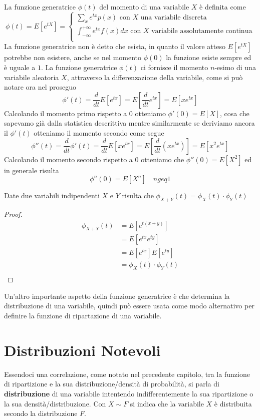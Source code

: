 \documentclass[a4paper,12pt, oneside]{book}
\begin{document}
La funzione generatrice $\phi(t)$ del momento di una variabile $X$ è definita come
\[ \phi(t) = E[e ^{tX}] = \begin{cases}
                              \sum _x e^{tx} p(x) \mbox{ con $X$ una variabile discreta}\\
                              \int _{-\infty}^{+\infty} e^{tx} f(x) dx \mbox{ con $X$ variabile assolutamente continua}\\
                          \end{cases} \]
La funzione generatrice non è detto che esista, in quanto il valore atteso $E[e^{tX}]$ potrebbe non esistere, anche se 
nel momento $\phi(0)$ la funzione esiste sempre ed è uguale a $1$.\newline
La funzione generatrice $\phi(t)$ ci fornisce il momento $n$-esimo di una variabile aleatoria $X$, attraverso la
differenzazione della variabile, come si può notare ora nel proseguo
\[ \phi'(t) = \frac{d}{dt} E[e^{tx}] = E[\frac{d}{dt} e^{tx}] = E[xe^{tx}] \]
Calcolando il momento primo rispetto a $0$ otteniamo $\phi'(0) = E[X]$, cosa che sapevamo già dalla statistica descrittiva
mentre similarmente se deriviamo ancora il $\phi'(t)$ otteniamo il momento secondo come segue
\[ \phi''(t) = \frac{d}{dt} \phi'(t) = \frac{d}{dt} E[xe^{tx}] = E[\frac{d}{dt}(xe^{tx})] = E[x^2e^{tx}] \]
Calcolando il momento secondo rispetto a $0$ otteniamo che $\phi''(0) = E[X^2]$ ed in generale risulta
\[ \phi^n(0) = E[X^n] \quad n geq 1 \]
\begin{teo}
    Date due variabili indipendenti $X$ e $Y$ risulta che $\phi_{X + Y}(t) = \phi_X(t) \cdot \phi_Y(t)$
\end{teo}
\begin{proof}
    \[ \begin{split}
        \phi_{X + Y}(t) & = E[e^{t(x + y)}] \\
                        & = E[e^{tx} e^{ty}] \\
                        & = E[e^{tx}] E[e^{ty}] \\
                        & = \phi_X(t) \cdot \phi_Y(t) \\
        \end{split} \]
\end{proof}
Un'altro importante aspetto della funzione generatrice è che determina la distribuzione di una variabile, quindi può
essere usata come modo alternativo per definire la funzione di ripartazione di una variabile.

\chapter{Distribuzioni Notevoli}
Essendoci una correlazione, come notato nel precedente capitolo, tra la funzione di ripartizione e
la sua distribuzione/densità di probabilità, si parla di \textbf{distribuzione} di una variabile
intentendo indifferentemente la sua ripartizione o la sua densità/distribuzione.\newline
Con $X \sim F$ si indica che la variabile $X$ è distribuita secondo la distribuzione $F$.
\end{document}
